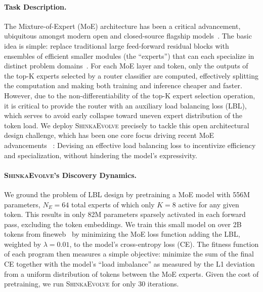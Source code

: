 \documentclass[11pt, a4paper]{include/gdm_format}
\newcommand{\ouralgo}{\textsc{ShinkaEvolve}\xspace}
\begin{document}
\paragraph{Task Description.} The Mixture-of-Expert (MoE) architecture \citep{moe_sem_1, moe_sem_2, moe_mod_1_2exp, moe_mod_2_switch_1exp} has been a critical advancement, ubiquitous amongst modern open and closed-source flagship models~\citep{moe_gemini15, guo2025deepseek, llama4, moe_qwen3,  moe_gemini25}. The basic idea is simple: replace traditional large feed-forward residual blocks with ensembles of efficient smaller modules (the ``experts'') that can each specialize in distinct problem domains~\citep{moe_mod_2_switch_1exp}. For each MoE layer and token, only the outputs of the top-K experts selected by a router classifier are computed, effectively splitting the computation and making both training and inference cheaper and faster. However, due to the non-differentiability of the top-K expert selection operation, it is critical to provide the router with an auxiliary load balancing loss (LBL), which serves to avoid early collapse toward uneven expert distribution of the token load. We deploy \ouralgo precisely to tackle this open architectural design challenge, which has been one core focus driving recent MoE advancements ~\citep{moe_sem_2, moe_mod_2_switch_1exp, moe_lbl_evo1, moe_lbl_evo2_zloss, moe_lbl_evo3, moe_deepseek_moe, moe_deepseek_demon, moe_similar_olmoe}: Devising an effective load balancing loss to incentivize efficiency and specialization, without hindering the model's expressivity.

\paragraph{\ouralgo's Discovery Dynamics.} We ground the problem of LBL design by pretraining a MoE model with 556M parameters, $N_E=64$ total experts of which only $K=8$ active for any given token. This results in only 82M parameters sparsely activated in each forward pass, excluding the token embeddings. We train this small model on over 2B tokens from fineweb~\citep{fineweb} by minimizing the MoE loss function adding the LBL, weighted by $\lambda=0.01$, to the model's cross-entropy loss (CE). The fitness function of each program then measures a simple objective:  minimize the sum of the final CE together with the model's ``load imbalance'' as measured by the L1 deviation from a uniform distribution of tokens between the MoE experts. Given the cost of pretraining, we run \ouralgo for only 30 iterations.
\end{document}

